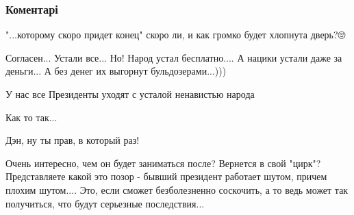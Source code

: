  
 
 
 
 
\subsubsection{Коментарі}

\begin{itemize}
 
"...которому скоро придет конец" скоро ли, и как громко будет хлопнута дверь?🙄

 
Согласен... Устали все... Но! Народ устал бесплатно.... А нацики устали даже за деньги... А без денег их выгорнут бульдозерами...)))

 
У нас все Президенты уходят с усталой ненавистью народа

 
Как то так...


Дэн, ну ты прав, в который раз!

 
Очень интересно, чем он будет заниматься после? Вернется в свой "цирк"?
Представляете какой это позор - бывший президент работает шутом, причем плохим
шутом.... Это, если сможет безболезненно соскочить, а то ведь может так
получиться, что будут серьезные последствия...

\end{itemize}

